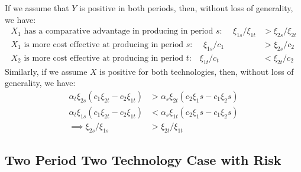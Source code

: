 \documentclass[12pt,a4paper]{extarticle}
\begin{document}
If we assume that $Y$ is positive in both periods, then, without loss of generality, we have:
\begin{align*}
\text{$X_1$ has a comparative advantage in producing in period $s$: } \quad 
{\xi_{1s}}/{\xi_{1t}} &> {\xi_{2s}}/{\xi_{2t}} \\
\text{$X_1$ is more cost effective at producing in period $s$: } \quad \xi_{1s}/c_1 &> \xi_{2s}/c_2  \\
\text{$X_2$ is more cost effective at producing in period $t$:} \quad \xi_{1t}/c_t &< \xi_{2t}/c_2
\end{align*}
Similarly, if we assume $X$ is positive for both technologies, then, without loss of generality, we have:
\begin{align*}
\alpha_t \xi_{2s} \left( c_1 \xi_{2t} - c_2 \xi_{1t} \right) &> \alpha_s \xi_{2t} \left( c_2 \xi_1s - c_1 \xi_2s \right) \\
\alpha_t \xi_{1s} \left( c_1 \xi_{2t} - c_2 \xi_{1t} \right) &< \alpha_s \xi_{1t} \left( c_2 \xi_1s - c_1 \xi_2s \right) \\
\implies \xi_{2s} / \xi_{1s} &> \xi_{2t}/ \xi_{1t}
\end{align*}


\subsection{Two Period Two Technology Case with Risk}
\end{document}

